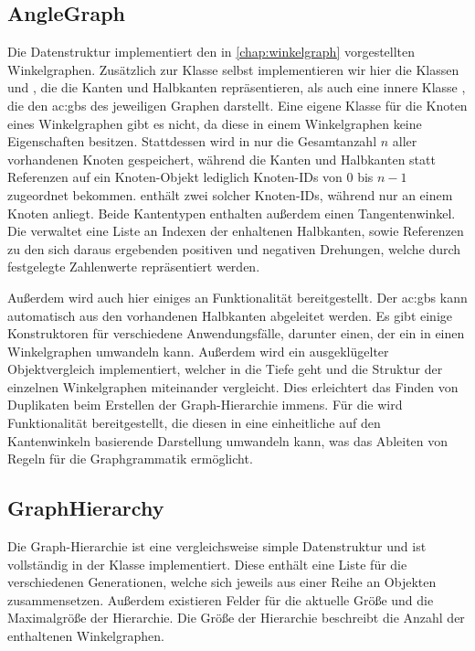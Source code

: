 \subsection{AngleGraph}
Die  Datenstruktur implementiert den in \autoref{chap:winkelgraph} vorgestellten Winkelgraphen. Zusätzlich zur
 Klasse selbst implementieren wir hier die Klassen  und , die die Kanten
und Halbkanten repräsentieren, als auch eine innere Klasse , die den \gls{ac:gbs} des jeweiligen Graphen
darstellt. Eine eigene Klasse für die Knoten eines Winkelgraphen gibt es nicht, da diese in einem Winkelgraphen keine Eigenschaften
besitzen. Stattdessen wird in  nur die Gesamtanzahl \(n\) aller vorhandenen Knoten gespeichert, während die Kanten
und Halbkanten statt Referenzen auf ein Knoten-Objekt lediglich Knoten-IDs von \(0\) bis \(n - 1\) zugeordnet bekommen.
 enthält zwei solcher Knoten-IDs, während  nur an einem Knoten anliegt. Beide Kantentypen
enthalten außerdem einen Tangentenwinkel. Die  verwaltet eine Liste an Indexen der enhaltenen Halbkanten, sowie
Referenzen zu den sich daraus ergebenden positiven und negativen Drehungen, welche durch festgelegte Zahlenwerte repräsentiert werden.

Außerdem wird auch hier einiges an Funktionalität bereitgestellt. Der \gls{ac:gbs} kann automatisch aus den vorhandenen Halbkanten
abgeleitet werden. Es gibt einige Konstruktoren für verschiedene Anwendungsfälle, darunter einen, der ein  in
einen Winkelgraphen umwandeln kann. Außerdem wird ein ausgeklügelter Objektvergleich implementiert, welcher in die Tiefe geht und
die Struktur der einzelnen Winkelgraphen miteinander vergleicht. Dies erleichtert das Finden von Duplikaten beim Erstellen der
Graph-Hierarchie immens. Für die  wird Funktionalität bereitgestellt, die diesen in eine einheitliche auf den
Kantenwinkeln basierende Darstellung umwandeln kann, was das Ableiten von Regeln für die Graphgrammatik ermöglicht.

\subsection{GraphHierarchy}
Die Graph-Hierarchie ist eine vergleichsweise simple Datenstruktur und ist vollständig in der Klasse  implementiert.
Diese enthält eine Liste für die verschiedenen Generationen, welche sich jeweils aus einer Reihe an  Objekten
zusammensetzen. Außerdem existieren Felder für die aktuelle Größe und die Maximalgröße der Hierarchie. Die Größe der Hierarchie
beschreibt die Anzahl der enthaltenen Winkelgraphen.

